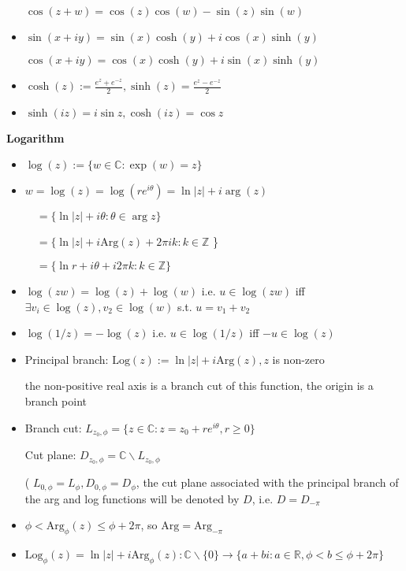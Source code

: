 \documentclass[10pt,a4paper]{article}
\begin{document}
\begin{multicols}{2}
\begin{itemize}
  $\cos(z+w)=\cos(z)\cos(w)-\sin(z)\sin(w)$
\item $\sin(x+iy)= \sin (x) \cosh (y) + i\cos (x) \sinh (y)$

  $\cos(x+iy)= \cos (x) \cosh (y) + i\sin (x) \sinh (y)$
\end{itemize}

\begin{itemize}
    \item $\displaystyle \cosh(z):= \frac{e^z+e^{-z}}{2}, \sinh(z)=\frac{e^z-e^{-z}}{2}$
\item $\sinh (iz)= i\sin z, \cosh (iz) = \cos z$
\end{itemize}

\textbf{Logarithm}

\begin{itemize}
    \item $\log(z):= \{ w \in \mathbb C: \exp (w) =z \}$
    \item $w=\log(z) = \log(re^{i\theta}) = \ln|z|+i \arg(z)$
    
      $\quad = \{ \ln|z|+i\theta: \theta \in \arg z \}$
    
      $\quad = \{ \ln|z|+i\text{Arg}(z)+2 \pi ik: k\in \mathbb Z$ \}
    
      $\quad = \{ \ln r +i\theta +i2\pi k: k \in \mathbb Z \}$
    \item $\log(zw)=\log (z)+\log (w)$ i.e. $u \in \log(zw)$ iff $\exists v_i \in \log (z), v_2 \in \log (w)$ s.t. $u=v_1+v_2$
    \item $\log(1/z)=-\log(z)$ i.e. $u \in \log(1/z)$ iff $-u \in \log(z)$
    \item Principal branch: $\text{Log}(z):= \ln|z|+i\text{Arg}(z), z$ is non-zero
      
      the non-positive real axis is a branch cut of this function, the origin is a branch point
    \item Branch cut: $L_{z_0, \phi} = \{ z\in \mathbb C: z=z_0+re^{i \theta}, r \geq 0\}$
      
      Cut plane: $D_{z_0, \phi} = \mathbb C \backslash L_{z_0, \phi} \quad$ 
      
      ( $L_{0, \phi} = L_\phi, D_{0, \phi} =  D_\phi$, the cut plane associated with the principal branch of the arg and log functions will be denoted by $D$, i.e. $D=D_{-\pi}$
    \item $\phi < \text{Arg}_\phi (z) \leq \phi +2\pi$, so $\text{Arg} = \text{Arg}_{- \pi}$
    \item $\text{Log}_\phi (z) = \ln|z|+i\text{Arg}_\phi(z) : \mathbb C \backslash\{0\} \rightarrow \{ a+bi: a\in \mathbb R, \phi < b \leq \phi +2\pi \}$
    

\end{itemize}
\end{multicols}
\end{document}

